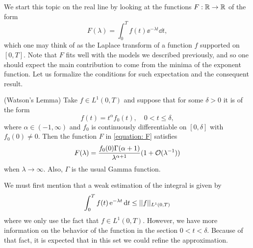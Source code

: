We start this topic on the real line by looking at the functions $F: \R \rightarrow \R$ of the form
\begin{equation}
	F(\lambda) = \int_{0}^{T} f(t) \ee^{-\lambda t} \dd t,
	\label{equation: F}
\end{equation}
which one may think of as the Laplace transform of a function $f$ supported on $[0,T]$. Note that $F$ fits well with the models we described previously, and so one should expect the main contribution to come from the minima of the exponent function. Let us formalize the conditions for such expectation and the consequent result.

\begin{teorema}	
	(Watson's Lemma) Take $f \in L^1(0,T)$ and suppose that for some $\delta > 0$ it is of the form
	\begin{equation}
		f(t) = t^\alpha f_0(t), \quad 0 < t \leq \delta,
	\end{equation}
	where $\alpha \in (-1, \infty)$ and $f_0$ is continuously differentiable on $[0, \delta]$ with $f_0(0) \neq 0$. Then the function $F$ in \eqref{equation: F} satisfies
	\begin{equation}
		F(\lambda) = \frac{f_0(0) \Gamma(\alpha + 1)}{\lambda^{\alpha + 1}} (1 + \Boh(\lambda^{-1}))
	\end{equation}
	when $\lambda \rightarrow \infty$. Also, $\Gamma$ is the usual Gamma function.
	\label{Theorema: Watson}
\end{teorema}

We must first mention that a weak estimation of the integral is given by
\begin{equation}
	\int_{0}^{T} f(t) \ee^{-\lambda t} \dd t \leq \normL{1}{f}{(0, T)}
\end{equation}
where we only use the fact that $f \in L^1(0,T)$. However, we have more information on the behavior of the function in the section $0 < t < \delta$. Because of that fact, it is expected that in this set we could refine the approximation.

